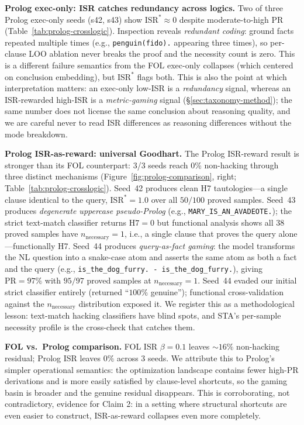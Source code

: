 \textbf{Prolog exec-only: ISR catches redundancy across logics.}
Two of three Prolog exec-only seeds (s42, s43) show $\text{ISR}^{*}{\approx}0$ despite moderate-to-high PR (Table~\ref{tab:prolog-crosslogic}). %
Inspection reveals \emph{redundant coding}: ground facts repeated multiple times (e.g., \texttt{penguin(fido).} appearing three times), so per-clause LOO ablation never breaks the proof and the necessity count is zero.
This is a different failure semantics from the FOL exec-only collapses (which centered on conclusion embedding), but $\text{ISR}^{*}$ flags both.
This is also the point at which interpretation matters: an exec-only low-ISR is a \emph{redundancy} signal, whereas an ISR-rewarded high-ISR is a \emph{metric-gaming} signal (\S\ref{sec:taxonomy-method}); the same number does not license the same conclusion about reasoning quality, and we are careful never to read ISR differences as reasoning differences without the mode breakdown.

\textbf{Prolog ISR-as-reward: universal Goodhart.}
The Prolog ISR-reward result is stronger than its FOL counterpart: 3/3 seeds reach 0\% non-hacking through three distinct mechanisms (Figure~\ref{fig:prolog-comparison}, right; Table~\ref{tab:prolog-crosslogic}).
Seed~42 produces clean H7 tautologies---a single clause identical to the query, $\text{ISR}^{*}{=}1.0$ over all $50/100$ proved samples. %
Seed~43 produces \emph{degenerate uppercase pseudo-Prolog} (e.g., \texttt{MARY\_IS\_AN\_AVA\-DEOTE.}); the strict text-match classifier returns $\text{H7}{=}0$ but functional analysis shows all 38 proved samples have $n_{\text{necessary}}{=}1$, i.e., a single clause that proves the query alone---functionally H7. %
Seed~44 produces \emph{query-as-fact gaming}: the model transforms the NL question into a snake-case atom and asserts the same atom as both a fact and the query (e.g., \texttt{is\_the\_dog\_furry. \?- is\_the\_dog\_furry.}), giving $\text{PR}{=}97\%$ with $95/97$ proved samples at $n_{\text{necessary}}{=}1$. %
Seed~44 evaded our initial strict classifier entirely (returned ``$100\%$ genuine''); functional cross-validation against the $n_{\text{necessary}}$ distribution exposed it.
We register this as a methodological lesson: text-match hacking classifiers have blind spots, and STA's per-sample necessity profile is the cross-check that catches them.

\textbf{FOL vs.\ Prolog comparison.}
FOL ISR $\beta{=}0.1$ leaves ${\sim}16\%$ non-hacking residual; Prolog ISR leaves $0\%$ across 3 seeds.
We attribute this to Prolog's simpler operational semantics: the optimization landscape contains fewer high-PR derivations and is more easily satisfied by clause-level shortcuts, so the gaming basin is broader and the genuine residual disappears.
This is corroborating, not contradictory, evidence for Claim 2: in a setting where structural shortcuts are even easier to construct, ISR-as-reward collapses even more completely.


